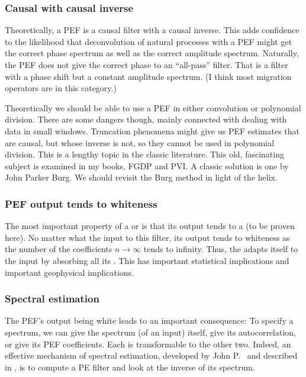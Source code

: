 \subsubsection{Causal with causal inverse}
Theoretically, a PEF is a causal filter with a causal inverse.
This adds confidence to the likelihood that deconvolution
of natural processes with a PEF might get the correct phase spectrum
as well as the correct amplitude spectrum.
Naturally, the PEF does not give the correct phase to an ``all-pass'' filter.
That is a filter with a phase shift but a constant amplitude spectrum.
(I think most migration operators are in this category.)

\par
Theoretically we should be able to use a PEF
in either convolution or polynomial division.
There are some dangers though,
mainly connected with dealing with data in small windows.
Truncation phenomena might give us PEF estimates
that are causal, but whose inverse is not,
so they cannot be used in polynomial division.
This is a lengthy topic in the classic literature.
This old, fascinating subject is examined in my books, FGDP and PVI.
A classic solution is one by John Parker Burg.
We should revisit the Burg method in light of the helix.

\subsubsection{PEF output tends to whiteness}
The most important property of a 
or  is that
its output tends to a  (to be proven here).
No matter what the input to this filter,
its output tends to whiteness as the number of the coefficients
$n \rightarrow \infty$ tends to infinity.
Thus, the  adapts itself to the input
by absorbing all its .
This has important statistical implications and
important geophysical implications.

\subsubsection{Spectral estimation}
\par
The PEF's output being white leads to an important consequence:
To specify a spectrum,
we can give the spectrum (of an input) itself,
give its autocorrelation,
or give its PEF coefficients.
Each is transformable to the other two.
Indeed, an effective mechanism of spectral estimation,
developed by John P.~ and described
in ,
is to compute a PE filter and look at the inverse of its spectrum.

